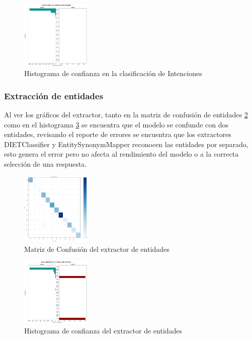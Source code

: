 \begin{figure}[H]
	\centering
	\includegraphics[angle=0,width=0.3\textwidth]{Figuras/intent_histogram.png}
	\caption{Histograma de confianza en la clasificación de Intenciones}
	\label{fig:intent_histograma}
\end{figure}
\subsubsection{Extracción de entidades}
Al ver los gráficos del extractor, tanto en la matriz de confusión de entidades
\ref{fig:entity_matriz} como en el histograma \ref{fig:entity_histograma} se encuentra que el
modelo se confunde con dos entidades, revisando el reporte de errores se encuentra que los
extractores DIETClassifier y EntitySynonymMapper reconocen las entidades por separado, esto genera
el error pero no afecta al rendimiento del modelo o a la correcta selección de una respuesta.

\begin{figure}[H]
	\centering
	\includegraphics[angle=0,width=0.3\textwidth]{Figuras/DIETClassifier_confusion_matrix.png}
	\caption{Matriz de Confusión del extractor de entidades}
	\label{fig:entity_matriz}
\end{figure}

\begin{figure}[H]
	\centering
	\includegraphics[angle=0,width=0.3\textwidth]{Figuras/DIETClassifier_histogram.png}
	\caption{Histograma de confianza del extractor de entidades}
	\label{fig:entity_histograma}
\end{figure}

